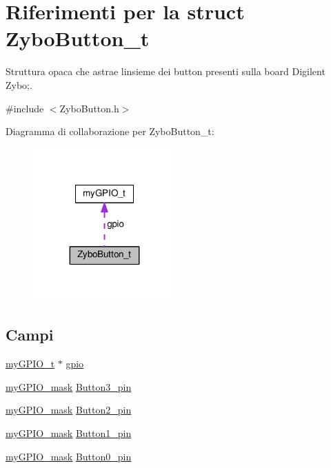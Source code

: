 \hypertarget{struct_zybo_button__t}{}\section{Riferimenti per la struct Zybo\+Button\+\_\+t}
\label{struct_zybo_button__t}


Struttura opaca che astrae l\textquotesingle{}insieme dei button presenti sulla board Digilent Zybo;.  




{\ttfamily \#include $<$Zybo\+Button.\+h$>$}



Diagramma di collaborazione per Zybo\+Button\+\_\+t\+:\nopagebreak
\begin{figure}[H]
\begin{center}
\leavevmode
\includegraphics[width=155pt]{struct_zybo_button__t__coll__graph}
\end{center}
\end{figure}
\subsection*{Campi}
\begin{DoxyCompactItemize}
\item 
\hyperlink{structmy_g_p_i_o__t}{my\+G\+P\+I\+O\+\_\+t} $\ast$ \hyperlink{struct_zybo_button__t_ac37ddc7c58d246d233dfb38037020184}{gpio}
\item 
\hyperlink{group__bare-metal_ga402a0d20afc0cb7c25554b8b023f4253}{my\+G\+P\+I\+O\+\_\+mask} \hyperlink{struct_zybo_button__t_ad462a15a55883fd4c86d2be9e11968a7}{Button3\+\_\+pin}
\item 
\hyperlink{group__bare-metal_ga402a0d20afc0cb7c25554b8b023f4253}{my\+G\+P\+I\+O\+\_\+mask} \hyperlink{struct_zybo_button__t_a3b4fe634c2d98ce55fdef526c2d230d1}{Button2\+\_\+pin}
\item 
\hyperlink{group__bare-metal_ga402a0d20afc0cb7c25554b8b023f4253}{my\+G\+P\+I\+O\+\_\+mask} \hyperlink{struct_zybo_button__t_a6cb60bb285e32e29c51c15e85206aaeb}{Button1\+\_\+pin}
\item 
\hyperlink{group__bare-metal_ga402a0d20afc0cb7c25554b8b023f4253}{my\+G\+P\+I\+O\+\_\+mask} \hyperlink{struct_zybo_button__t_af7d7d5a9c9fc174e8f4ee4c762c2abee}{Button0\+\_\+pin}
\end{DoxyCompactItemize}


